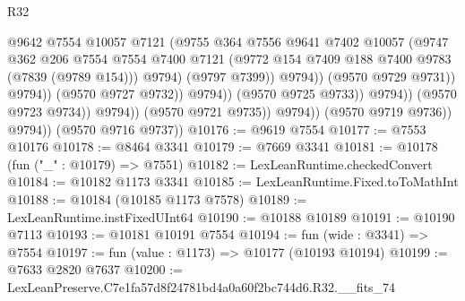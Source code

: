 \begin{lexlean}{R32}
\begin{coremodule}
                                              @9642
                                              @7554
                                              @10057
                                              @7121
                                              (@9755
                                                @364
                                                @7556
                                                @9641
                                                @7402
                                                @10057
                                                (@9747
                                                  @362
                                                  @206
                                                  @7554
                                                  @7554
                                                  @7400
                                                  @7121
                                                  (@9772
                                                    @154
                                                    @7409
                                                    @188
                                                    @7400
                                                    @9783
                                                    (@7839 (@9789 @154)))
                                                  @9794)
                                                (@9797 @7399))
                                              @9794))
                                          (@9570 @9729 @9731))
                                        @9794))
                                    (@9570 @9727 @9732))
                                  @9794))
                              (@9570 @9725 @9733))
                            @9794))
                        (@9570 @9723 @9734))
                      @9794))
                  (@9570 @9721 @9735))
                @9794))
            (@9570 @9719 @9736))
          @9794))
      (@9570 @9716 @9737))
@10176 := @9619 @7554
@10177 := @7553 @10176
@10178 := @8464 @3341
@10179 := @7669 @3341
@10181 := @10178 (fun ("_" : @10179) => @7551)
@10182 := LexLeanRuntime.checkedConvert
@10184 := @10182 @1173 @3341
@10185 := LexLeanRuntime.Fixed.toToMathInt
@10188 := @10184 (@10185 @1173 @7578)
@10189 := LexLeanRuntime.instFixedUInt64
@10190 := @10188 @10189
@10191 := @10190 @7113
@10193 := @10181 @10191 @7554
@10194 := fun (wide : @3341) => @7554
@10197 := fun (value : @1173) => @10177 (@10193 @10194)
@10199 := @7633 @2820 @7637
@10200 := LexLeanPreserve.C7e1fa57d8f24781bd4a0a60f2bc744d6.R32.__fits_74

\end{coremodule}
\end{lexlean}
